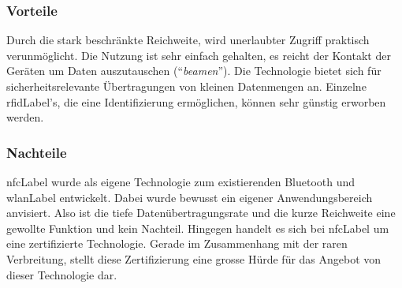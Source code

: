 \subsubsection{Vorteile}
Durch die stark beschränkte Reichweite, wird unerlaubter Zugriff praktisch verunmöglicht.
Die Nutzung ist sehr einfach gehalten, es reicht der Kontakt der Geräten um Daten auszutauschen ("`\textit{beamen}"').
Die Technologie bietet sich für sicherheitsrelevante Übertragungen von kleinen Datenmengen an.
Einzelne \gls{rfidLabel}'s, die eine Identifizierung ermöglichen, können sehr günstig erworben werden.

\subsubsection{Nachteile}
\gls{nfcLabel} wurde als eigene Technologie zum existierenden Bluetooth und \gls{wlanLabel} entwickelt. Dabei wurde bewusst ein eigener Anwendungsbereich anvisiert. Also ist die tiefe Datenübertragungsrate und die kurze Reichweite eine gewollte Funktion und kein Nachteil.
Hingegen handelt es sich bei \gls{nfcLabel} um eine zertifizierte Technologie.
Gerade im Zusammenhang mit der raren Verbreitung, stellt diese Zertifizierung eine grosse Hürde für das Angebot von dieser Technologie dar.




